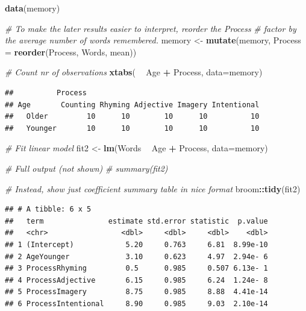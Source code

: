 \documentclass[]{book}
\newenvironment{Shaded}{\begin{snugshade}}{\end{snugshade}}
\newcommand{\CommentTok}[1]{\textcolor[rgb]{0.56,0.35,0.01}{\textit{#1}}}
\newcommand{\DataTypeTok}[1]{\textcolor[rgb]{0.13,0.29,0.53}{#1}}
\newcommand{\KeywordTok}[1]{\textcolor[rgb]{0.13,0.29,0.53}{\textbf{#1}}}
\newcommand{\NormalTok}[1]{#1}
\newcommand{\OperatorTok}[1]{\textcolor[rgb]{0.81,0.36,0.00}{\textbf{#1}}}
\newcommand{\StringTok}[1]{\textcolor[rgb]{0.31,0.60,0.02}{#1}}
\begin{document}
\begin{Shaded}
\begin{Highlighting}[]
\KeywordTok{data}\NormalTok{(memory)}

\CommentTok{# To make the later results easier to interpret, reorder the Process}
\CommentTok{# factor by the average number of words remembered.}
\NormalTok{memory <-}\StringTok{ }\KeywordTok{mutate}\NormalTok{(memory, }
                 \DataTypeTok{Process =} \KeywordTok{reorder}\NormalTok{(Process, Words, mean))}

\CommentTok{# Count nr of observations}
\KeywordTok{xtabs}\NormalTok{( }\OperatorTok{~}\StringTok{ }\NormalTok{Age }\OperatorTok{+}\StringTok{ }\NormalTok{Process, }\DataTypeTok{data=}\NormalTok{memory)}
\end{Highlighting}
\end{Shaded}

\begin{verbatim}
##          Process
## Age       Counting Rhyming Adjective Imagery Intentional
##   Older         10      10        10      10          10
##   Younger       10      10        10      10          10
\end{verbatim}

\begin{Shaded}
\begin{Highlighting}[]
\CommentTok{# Fit linear model}
\NormalTok{fit2 <-}\StringTok{ }\KeywordTok{lm}\NormalTok{(Words }\OperatorTok{~}\StringTok{ }\NormalTok{Age }\OperatorTok{+}\StringTok{ }\NormalTok{Process, }\DataTypeTok{data=}\NormalTok{memory)}

\CommentTok{# Full output (not shown)}
\CommentTok{# summary(fit2)}

\CommentTok{# Instead, show just coefficient summary table in nice format}
\NormalTok{broom}\OperatorTok{::}\KeywordTok{tidy}\NormalTok{(fit2)}
\end{Highlighting}
\end{Shaded}

\begin{verbatim}
## # A tibble: 6 x 5
##   term               estimate std.error statistic  p.value
##   <chr>                 <dbl>     <dbl>     <dbl>    <dbl>
## 1 (Intercept)            5.20     0.763     6.81  8.99e-10
## 2 AgeYounger             3.10     0.623     4.97  2.94e- 6
## 3 ProcessRhyming         0.5      0.985     0.507 6.13e- 1
## 4 ProcessAdjective       6.15     0.985     6.24  1.24e- 8
## 5 ProcessImagery         8.75     0.985     8.88  4.41e-14
## 6 ProcessIntentional     8.90     0.985     9.03  2.10e-14
\end{verbatim}
\end{document}
